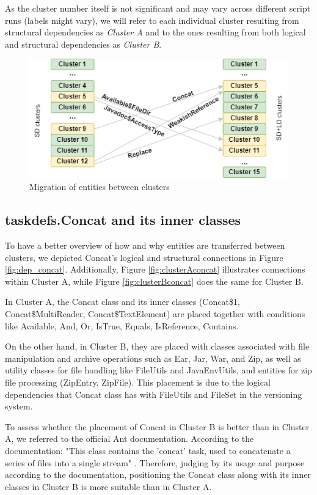 \documentclass[conference, a4paper]{IEEEtran}
\begin{document}
As the cluster number itself is not significant and may vary across different script runs (labels might vary), we will refer to each individual cluster resulting from structural dependencies as \textit{Cluster A} and to the ones resulting from both logical and structural dependencies as \textit{Cluster B}.

\begin{figure}
\centering
\includegraphics[width=\columnwidth]{clusters.png}
\caption{Migration of entities between clusters}
\label{fig:clustersmigration}
\centering
\end{figure}

\subsection{taskdefs.Concat and its inner classes}

To have a better overview of how and why entities are transferred between clusters, we depicted Concat's logical and structural connections in Figure \ref{fig:dep_concat}. Additionally, Figure \ref{fig:clusterAconcat} illustrates connections within Cluster A, while Figure \ref{fig:clusterBconcat} does the same for Cluster B.

In Cluster A, the Concat class and its inner classes (Concat\$1, Concat\$MultiReader, Concat\$TextElement) are placed together with conditions like Available, And, Or, IsTrue, Equals, IsReference, Contains.

On the other hand, in Cluster B, they are placed with classes associated with file manipulation and archive operations such as Ear, Jar, War, and Zip, as well as utility classes for file handling like FileUtils and JavaEnvUtils, and entities for zip file processing (ZipEntry, ZipFile). This placement is due to the logical dependencies that Concat class has with FileUtils and FileSet in the versioning system.

To assess whether the placement of Concat in Cluster B is better than in Cluster A, we referred to the official Ant documentation. According to the documentation: "This class contains the 'concat' task, used to concatenate a series of files into a single stream" \cite{ant_concat}. Therefore, judging by its usage and purpose according to the documentation, positioning the Concat class along with its inner classes in Cluster B is more suitable than in Cluster A.
\end{document}
